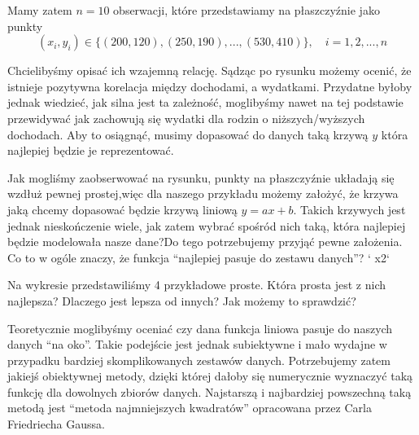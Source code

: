 \documentclass[a4paper,12pt]{article}
\begin{document}
Mamy zatem $n = 10$ obserwacji, które przedstawiamy na płaszczyźnie jako punkty
\[
	(x_i, y_i) \in \{(200,120),(250,190),...,(530,410)\}, \quad i = 1,2,...,n
\]

Chcielibyśmy opisać ich wzajemną relację. Sądząc po rysunku możemy ocenić, że istnieje pozytywna korelacja między dochodami, a wydatkami. Przydatne byłoby jednak wiedzieć, jak silna jest ta zależność, moglibyśmy nawet na tej podstawie przewidywać jak zachowują się wydatki dla rodzin o niższych/wyższych dochodach. Aby to osiągnąć, musimy dopasować do danych taką krzywą $y$  która najlepiej będzie je reprezentować.

Jak mogliśmy zaobserwować na rysunku, punkty na płaszczyźnie układają się wzdłuż pewnej prostej,więc dla naszego przykładu możemy założyć, że krzywa jaką chcemy dopasować będzie krzywą liniową $y = ax+b$. Takich krzywych jest jednak nieskończenie wiele, jak zatem wybrać spośród nich taką, która najlepiej będzie modelowała nasze dane?Do tego potrzebujemy przyjąć pewne założenia. Co to w ogóle znaczy, że funkcja “najlepiej pasuje do zestawu danych”? ` x2`

\newpage

Na wykresie przedstawiliśmy 4 przykładowe proste. Która prosta jest z nich najlepsza? Dlaczego jest lepsza od innych? Jak możemy to sprawdzić?

\begin{figure}[h!]
	\centering
\end{figure}

Teoretycznie moglibyśmy oceniać czy dana funkcja liniowa pasuje do naszych danych “na oko”. Takie podejście jest jednak subiektywne i mało wydajne w przypadku bardziej skomplikowanych zestawów danych. Potrzebujemy zatem jakiejś obiektywnej metody, dzięki której dałoby się numerycznie wyznaczyć taką funkcję dla dowolnych zbiorów danych. 
Najstarszą i najbardziej powszechną taką metodą jest “metoda najmniejszych kwadratów” opracowana przez Carla Friedriecha Gaussa. 
\end{document}
